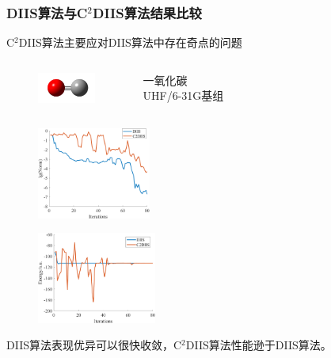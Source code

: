 \documentclass[10pt,aspectratio=43,mathserif,UTF8]{beamer}
\begin{document}
\begin{frame}
	\frametitle{DIIS算法与C$^2$DIIS算法结果比较}
	C$^2$DIIS算法主要应对DIIS算法中存在奇点的问题\\
	\begin{columns}[c]
		\begin{figure}[htbp]
			\centering
			\includegraphics[height=1cm]{figure/co/CO2.jpg}
		\end{figure}

		一氧化碳\\
		UHF/6-31G基组
	\end{columns}
	\begin{figure}[ht!]
		\centering
		\begin{minipage}{0.4\linewidth}
			\centering
			\includegraphics[height=3cm]{figure/co/LOG3.png}
			\label{fig:co:lognorm}
		\end{minipage}
		\begin{minipage}{0.4\linewidth}
			\centering
			\includegraphics[height=3cm]{figure/co/E4.png}
			\label{fig:co:E}
		\end{minipage}
		\label{fig:co}
	\end{figure}
	\centerline{DIIS算法表现优异可以很快收敛，C$^2$DIIS算法性能逊于DIIS算法。}
\end{frame}


\end{document}
